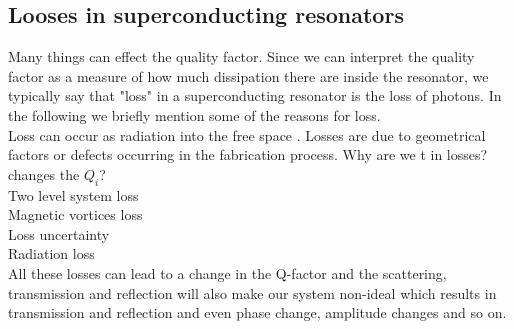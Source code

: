         \subsection{Looses in superconducting resonators}
        Many things can effect the quality factor. Since we can interpret the quality factor as a measure of how much dissipation there are inside the resonator, we typically say that "loss" in a superconducting resonator is the loss of photons. In the following we briefly mention some of the reasons for loss.
        \\
        Loss can occur as radiation into the free space \cite{Zmuidzinas2012}. 
        Losses are due to geometrical factors or defects occurring in the fabrication process. Why are we t in losses? changes the $Q_i$?
        \\
        Two level system loss
        \\	
        Magnetic vortices loss 
        \\
        Loss uncertainty 
        \\
        Radiation loss
        \\
        All these losses can lead to a change in the Q-factor and the scattering, transmission and reflection will also make our system non-ideal which results in transmission and  reflection and even phase change, amplitude changes and so on. 



